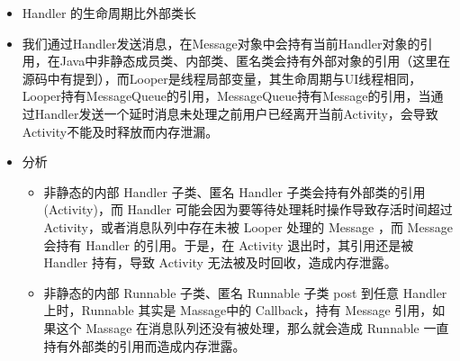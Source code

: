 \documentclass[9pt, b5paper]{article}
\begin{document}
\begin{itemize}
\item Handler 的生命周期比外部类长
\item 我们通过Handler发送消息，在Message对象中会持有当前Handler对象的引用，在Java中非静态成员类、内部类、匿名类会持有外部对象的引用（这里在源码中有提到），而Looper是线程局部变量，其生命周期与UI线程相同，Looper持有MessageQueue的引用，MessageQueue持有Message的引用，当通过Handler发送一个延时消息未处理之前用户已经离开当前Activity，会导致Activity不能及时释放而内存泄漏。
\item 分析
\begin{itemize}
\item 非静态的内部 Handler 子类、匿名 Handler 子类会持有外部类的引用(Activity)，而 Handler 可能会因为要等待处理耗时操作导致存活时间超过 Activity，或者消息队列中存在未被 Looper 处理的 Message ，而 Message 会持有 Handler 的引用。于是，在 Activity 退出时，其引用还是被 Handler 持有，导致 Activity 无法被及时回收，造成内存泄露。
\item 非静态的内部 Runnable 子类、匿名 Runnable 子类 post 到任意 Handler 上时，Runnable 其实是 Massage中的 Callback，持有 Message 引用，如果这个 Massage 在消息队列还没有被处理，那么就会造成 Runnable 一直持有外部类的引用而造成内存泄露。
\end{itemize}
\end{itemize}
\end{document}
